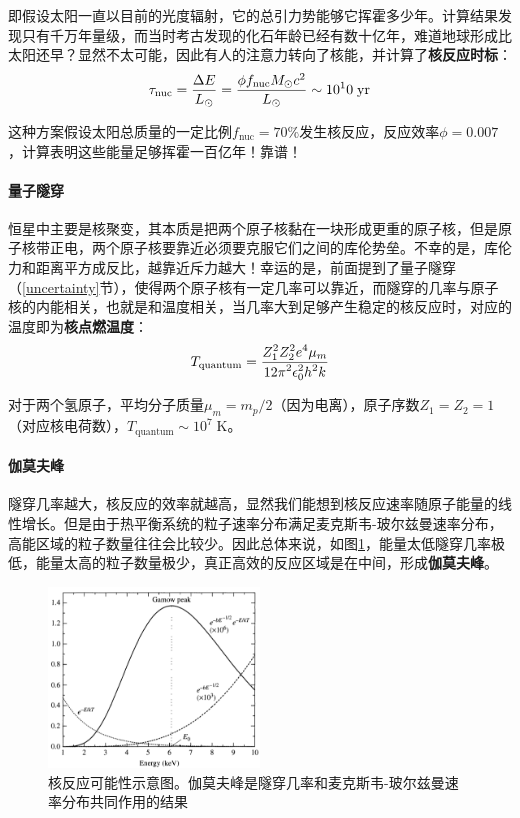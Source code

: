 \documentclass[openany]{ctexbook}
\begin{document}
即假设太阳一直以目前的光度辐射，它的总引力势能够它挥霍多少年。计算结果发现只有千万年量级，而当时考古发现的化石年龄已经有数十亿年，难道地球形成比太阳还早？显然不太可能，因此有人的注意力转向了核能，并计算了\textbf{核反应时标}：
\begin{equation}
  \tau_\mathrm{nuc}={\Delta E\over L_\odot}={\phi f_\mathrm{nuc}M_\odot c^2 \over L_\odot}\sim10^10\;\mathrm{yr}
\end{equation}

这种方案假设太阳总质量的一定比例$f_\mathrm{nuc}=70\%$发生核反应，反应效率$\phi=0.007$，计算表明这些能量足够挥霍一百亿年！靠谱！

\paragraph{量子隧穿}
恒星中主要是核聚变，其本质是把两个原子核黏在一块形成更重的原子核，但是原子核带正电，两个原子核要靠近必须要克服它们之间的库伦势垒。不幸的是，库伦力和距离平方成反比，越靠近斥力越大！幸运的是，前面提到了量子隧穿（\ref{uncertainty}节），使得两个原子核有一定几率可以靠近，而隧穿的几率与原子核的内能相关，也就是和温度相关，当几率大到足够产生稳定的核反应时，对应的温度即为\textbf{核点燃温度}：
\begin{equation}
  T_\mathrm{quantum}={\displaystyle Z_1^2 Z_2^2 e^4 \mu_m \over \displaystyle 12\pi^2 \epsilon^2_0 h^2 k}
\end{equation}

对于两个氢原子，平均分子质量$\mu_m=m_p/2$（因为电离），原子序数$Z_1=Z_2=1$（对应核电荷数），$T_\mathrm{quantum}\sim10^7\;\mathrm K$。

\paragraph{伽莫夫峰}
隧穿几率越大，核反应的效率就越高，显然我们能想到核反应速率随原子能量的线性增长。但是由于热平衡系统的粒子速率分布满足麦克斯韦-玻尔兹曼速率分布，高能区域的粒子数量往往会比较少。因此总体来说，如图\ref{fig:gamow}，能量太低隧穿几率极低，能量太高的粒子数量极少，真正高效的反应区域是在中间，形成\textbf{伽莫夫峰}。

\begin{figure}[hbt]
  \centering
  \includegraphics[width=5.6cm]{chapters/10/gamowpeak}
  \caption{核反应可能性示意图。伽莫夫峰是隧穿几率和麦克斯韦-玻尔兹曼速率分布共同作用的结果}
  \label{fig:gamow}
\end{figure}
\end{document}
